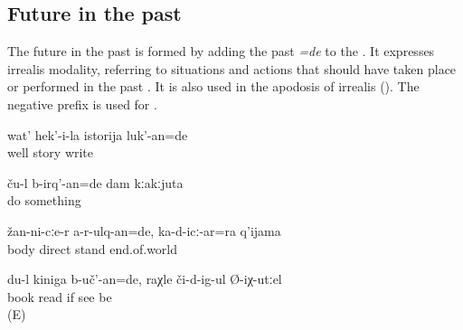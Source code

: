 
\subsection{Future in the past}
\label{ssec:Future in the past}

The future in the past is formed by adding the past  \textit{=de} to the  . It expresses irrealis modality, referring to situations and actions that should have taken place or performed in the past . It is also used in the  apodosis of irrealis   (). The negative prefix is used for  .
%
\begin{exe}
	\ex	\label{ex:‎Her story (i.e. autobiography) should be written down}
	\gll	wat'	hek'-i-la	istorija	luk'-an=de\\
		well		story	write\\
	\glt	{}

	\ex	\label{ex:They would/should have done something for me}
	\gll	ču-l	b-irq'-an=de	dam	kːakːjuta \\
			do		something\\
	\glt	{}

	\ex	\label{ex:You should have not left your body, even if the end of the world comes}
	\gll	žan-ni-cːe-r	a-r-ulq-an=de,		ka-d-icː-ar=ra	q'ijama\\
		body	direct		stand	end.of.world\\
	\glt	{}

	\ex	\label{ex:I would have read the book if you (masc.) would have seen it}
	\gll	du-l	kiniga	b-uč'-an=de,	raχle	či-d-ig-ul	Ø-iχ-utːel\\
			book	read	if	see	be\\
	\glt	{} (E)
\end{exe}


